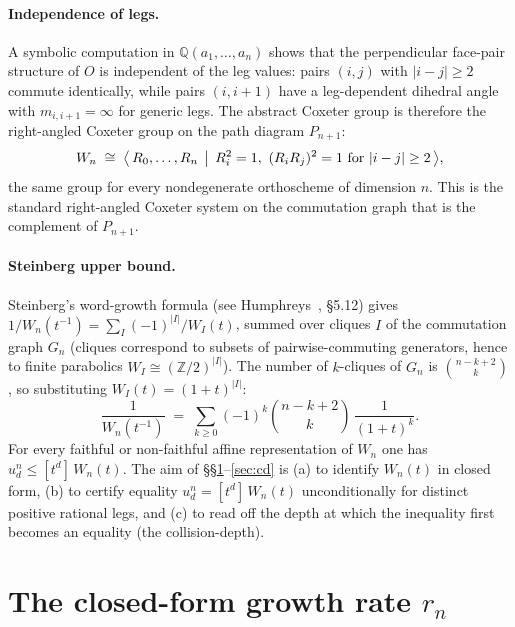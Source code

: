 \documentclass[11pt,a4paper]{article}
\theoremstyle{remark}
\theoremstyle{plain}
\begin{document}
\paragraph{Independence of legs.}  A symbolic computation in
$\mathbb{Q}(a_1, \ldots, a_n)$ shows that the perpendicular face-pair
structure of $O$ is independent of the leg values: pairs $(i, j)$
with $|i - j| \ge 2$ commute identically, while pairs $(i, i+1)$
have a leg-dependent dihedral angle with $m_{i,i+1} = \infty$ for
generic legs.  The abstract Coxeter group is therefore the
right-angled Coxeter group on the path diagram $P_{n+1}$:
\begin{equation}\label{eq:Wn-presentation}
W_n  \;\cong\;  \bigl\langle\, R_0, \ldots, R_n \,\bigm|\, R_i^2 = 1,\
(R_i R_j)^2 = 1 \text{ for } |i - j| \ge 2 \,\bigr\rangle,
\end{equation}
the same group for every nondegenerate orthoscheme of dimension $n$.
This is the standard right-angled Coxeter system on the commutation
graph that is the complement of $P_{n+1}$.

\paragraph{Steinberg upper bound.}  Steinberg's word-growth formula
(see Humphreys~\cite{humphreys90}, §5.12) gives
$1 / W_n(t^{-1}) = \sum_I (-1)^{|I|} / W_I(t)$, summed over cliques
$I$ of the commutation graph $G_n$ (cliques correspond to subsets
of pairwise-commuting generators, hence to finite parabolics
$W_I \cong (\mathbb{Z}/2)^{|I|}$).  The number of $k$-cliques of
$G_n$ is $\binom{n-k+2}{k}$, so substituting $W_I(t) = (1+t)^{|I|}$:
\begin{equation}\label{eq:steinberg-Wn}
\frac{1}{W_n(t^{-1})}  \;=\;  \sum_{k \ge 0} (-1)^k \binom{n - k + 2}{k}\,
\frac{1}{(1+t)^k}.
\end{equation}
For every faithful or non-faithful affine representation of $W_n$ one
has $u_d^n \le [t^d]\, W_n(t)$.  The aim of \S\S\ref{sec:rate}--\ref{sec:cd}
is (a) to identify $W_n(t)$ in closed form, (b) to certify equality
$u_d^n = [t^d]\, W_n(t)$ unconditionally for distinct positive rational
legs, and (c) to read off the depth at which the inequality first
becomes an equality (the collision-depth).

\section{The closed-form growth rate $r_n$}\label{sec:rate}
\end{document}
